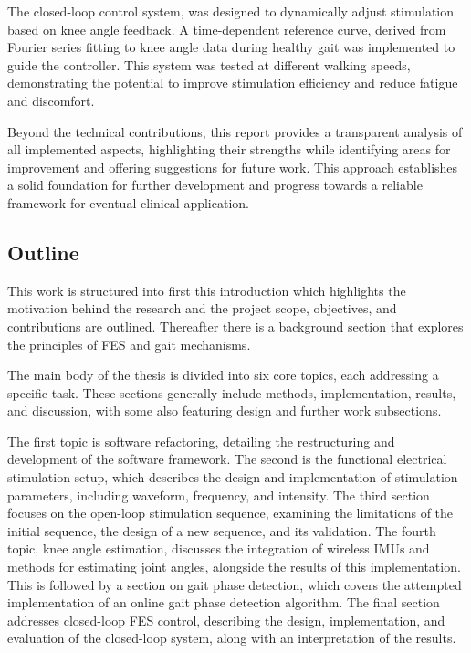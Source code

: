 The closed-loop control system, was designed to dynamically adjust stimulation based on knee angle feedback. A time-dependent reference curve, derived from Fourier series fitting to knee angle data during healthy gait was implemented to guide the controller. This system was tested at different walking speeds, demonstrating the potential to improve stimulation efficiency and reduce fatigue and discomfort.

Beyond the technical contributions, this report provides a transparent analysis of all implemented aspects, highlighting their strengths while identifying areas for improvement and offering suggestions for future work. This approach establishes a solid foundation for further development and progress towards a reliable framework for eventual clinical application.


\subsection{Outline}
This work is structured into first this introduction which highlights the motivation behind the research and the project scope, objectives, and contributions are outlined. Thereafter there is a background section that explores the principles of FES and gait mechanisms.

The main body of the thesis is divided into six core topics, each addressing a specific task. These sections generally include methods, implementation, results, and discussion, with some also featuring design and further work subsections.

The first topic is software refactoring, detailing the restructuring and development of the software framework. The second is the functional electrical stimulation setup, which describes the design and implementation of stimulation parameters, including waveform, frequency, and intensity. The third section focuses on the open-loop stimulation sequence, examining the limitations of the initial sequence, the design of a new sequence, and its validation. The fourth topic, knee angle estimation, discusses the integration of wireless IMUs and methods for estimating joint angles, alongside the results of this implementation. This is followed by a section on gait phase detection, which covers the attempted implementation of an online gait phase detection algorithm. The final section addresses closed-loop FES control, describing the design, implementation, and evaluation of the closed-loop system, along with an interpretation of the results.










